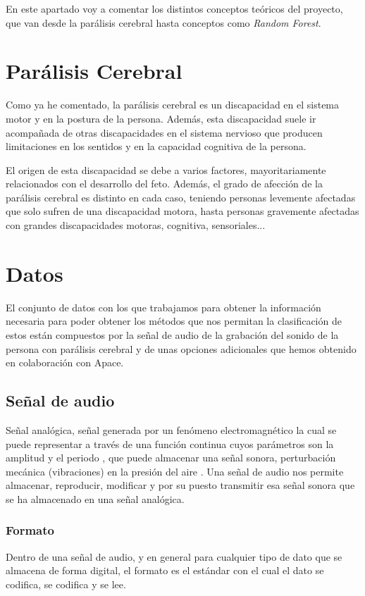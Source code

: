 
En este apartado voy a comentar los distintos conceptos teóricos del proyecto, que van desde la parálisis cerebral hasta conceptos como \textit{Random Forest}.

\section{Parálisis Cerebral}
Como ya he comentado, la parálisis cerebral es un discapacidad en el sistema motor y en la postura de la persona. Además, esta discapacidad suele ir acompañada de otras discapacidades en el sistema nervioso que producen limitaciones en los sentidos y en la capacidad cognitiva de la persona.

El origen de esta discapacidad se debe a varios factores, mayoritariamente relacionados con el desarrollo del feto. Además, el grado de afección de la parálisis cerebral es distinto en cada caso, teniendo personas levemente afectadas que solo sufren de una discapacidad motora, hasta personas gravemente afectadas con grandes discapacidades motoras, cognitiva, sensoriales...

\section{Datos}
El conjunto de datos con los que trabajamos para obtener la información necesaria para poder obtener los métodos que nos permitan la clasificación de estos están compuestos por la señal de audio de la grabación del sonido de la persona con parálisis cerebral y de unas opciones adicionales que hemos obtenido en colaboración con Apace.
\subsection{Señal de audio}
Señal analógica, señal generada por un fenómeno electromagnético la cual se puede representar a través de una función continua cuyos parámetros son la amplitud y el periodo \cite{analogica}, que puede almacenar una señal sonora, perturbación mecánica (vibraciones) en la presión del aire \cite{pierce1995senales}. Una señal de audio nos permite almacenar, reproducir, modificar y por su puesto transmitir esa señal sonora que se ha almacenado en una señal analógica.
\subsubsection{Formato}
Dentro de una señal de audio, y en general para cualquier tipo de dato que se almacena de forma digital, el formato es el estándar con el cual el dato se codifica, se codifica y se lee.

